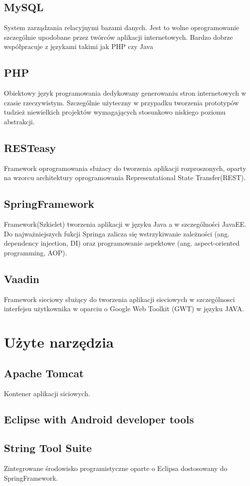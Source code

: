 \documentclass[11pt,a4paper,polish,thesis]{dcsbook}
\begin{document}
\subsection{MySQL}
System zarządzania relacyjnymi bazami danych. Jest to wolne oprogramowanie szczególnie upodobane przez twórców aplikacji internetowych. Bardzo dobrze współpracuje z językami takimi jak PHP czy Java
\subsection{PHP}
Obiektowy język programowania dedykowany generowaniu stron internetowych w czasie rzeczywistym. Szczególnie użyteczny w przypadku tworzenia prototypów tudzież niewielkich projektów wymagających stosunkowo niskiego poziomu abstrakcji.
\subsection{RESTeasy}
Framework oprogramowania służacy do tworzenia aplikacji rozproszonych, oparty na wzorcu architektury oprogramowania Representational State Transfer(REST).
\subsection{SpringFramework}
Framework(Szkielet) tworzenia aplikacji w języku Java a w szczególności JavaEE. Do najważniejszych fukcji Springa zalicza się wstrzykiwanie zależności (ang. dependency injection, DI) oraz programowanie aspektowe (ang. aspect-oriented programming, AOP).  
\subsection{Vaadin}
Framework sieciowy służący do tworzenia aplikacji sieciowych w szczególnosci interfejsu użytkownika w oparciu o Google Web Toolkit (GWT) w języku JAVA.


\section{Użyte narzędzia}
\subsection{Apache Tomcat}
Kontener aplikacji siciowych.
\subsection{Eclipse with Android developer tools}
\subsection{String Tool Suite}
Zintegrowane środowisko programistyczne oparte o Eclipsa dostosowany do SpringFramework.
\end{document}
